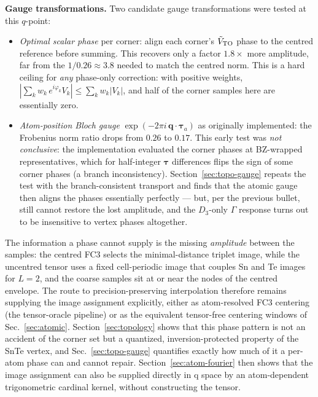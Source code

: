 \documentclass[11pt,a4paper]{article}
\begin{document}
\smallskip
\noindent\textbf{Gauge transformations.}
Two candidate gauge transformations were tested at this $q$-point:
\begin{itemize}
\item \textit{Optimal scalar phase} per corner: align each corner's
  $\tilde V_{\rm TO}$ phase to the centred reference before summing.
  This recovers only a factor $1.8\times$ more amplitude, far from the
  $1/0.26\approx3.8$ needed to match the centred norm.  This is a hard
  ceiling for \emph{any} phase-only correction: with positive weights,
  $|\sum_k w_k\,e^{i\varphi_k} V_k| \le \sum_k w_k |V_k|$, and half of
  the corner samples here are essentially zero.
\item \textit{Atom-position Bloch gauge} $\exp(-2\pi i\,\mathbf
  q\cdot\boldsymbol\tau_a)$ as originally implemented: the Frobenius
  norm ratio drops from $0.26$ to $0.17$.  This early test was
  \emph{not conclusive}: the implementation evaluated the corner
  phases at BZ-wrapped representatives, which for half-integer
  $\boldsymbol\tau$ differences flips the sign of some corner phases
  (a branch inconsistency).  Section~\ref{sec:topo-gauge} repeats the
  test with the branch-consistent transport and finds that the atomic
  gauge then aligns the phases essentially perfectly --- but, per the
  previous bullet, still cannot restore the lost amplitude, and the
  $D_3$-only $\Gamma$ response turns out to be insensitive to vertex
  phases altogether.
\end{itemize}

The information a phase cannot supply is the missing \emph{amplitude}
between the samples: the centred FC3 selects the minimal-distance
triplet image, while the uncentred tensor uses a fixed cell-periodic
image that couples Sn and Te images for $L=2$, and the coarse samples
sit at or near the nodes of the centred envelope.  The route to
precision-preserving interpolation therefore remains supplying the
image assignment explicitly, either as atom-resolved FC3 centering
(the tensor-oracle pipeline) or as the equivalent tensor-free
centering windows of Sec.~\ref{sec:atomic}.
Section~\ref{sec:topology} shows that this phase pattern is not an
accident of the corner set but a quantized, inversion-protected
property of the SnTe vertex, and Sec.~\ref{sec:topo-gauge} quantifies
exactly how much of it a per-atom phase can and cannot repair.
Section~\ref{sec:atom-fourier} then shows that the image assignment can
also be supplied directly in q space by an atom-dependent trigonometric
cardinal kernel, without constructing the tensor.
\end{document}
